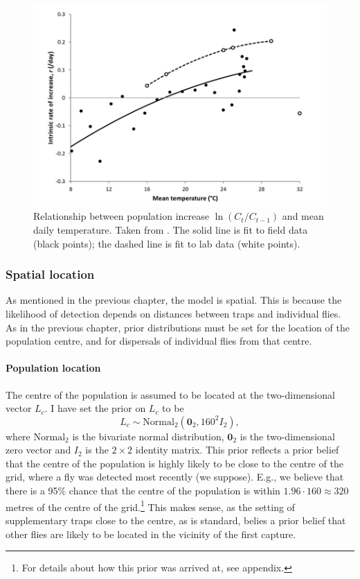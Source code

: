 \documentclass[
  oneside]{book}
\begin{document}
\begin{figure}

{\centering \includegraphics[width=0.75\linewidth]{references/ksplot} 

}

\caption{Relationship between population increase \(\ln (C_t / C_{t-1})\) and mean daily temperature. Taken from \citet{ks2019}. The solid line is fit to field data (black points); the dashed line is fit to lab data (white points).}\label{fig:ksplot}
\end{figure}

\hypertarget{spatial-location}{%
\subsubsection{Spatial location}\label{spatial-location}}

As mentioned in the previous chapter, the model is spatial. This is because the likelihood of detection depends on distances between traps and individual flies. As in the previous chapter, prior distributions must be set for the location of the population centre, and for dispersals of individual flies from that centre.

\hypertarget{population-location}{%
\paragraph{Population location}\label{population-location}}

The centre of the population is assumed to be located at the two-dimensional vector \(L_c\). I have set the prior on \(L_c\) to be
\[
L_c \sim \mathrm {Normal}_2 (\mathbf 0_2, 160^2 I_2),
\]
where \(\mathrm{Normal}_2\) is the bivariate normal distribution, \(\mathbf 0_2\) is the two-dimensional zero vector and \(I_2\) is the \(2 \times 2\) identity matrix. This prior reflects a prior belief that the centre of the population is highly likely to be close to the centre of the grid, where a fly was detected most recently (we suppose). E.g., we believe that there is a 95\% chance that the centre of the population is within \(1.96 \cdot 160 \approx 320\) metres of the centre of the grid.\footnote{For details about how this prior was arrived at, see appendix.} This makes sense, as the setting of supplementary traps close to the centre, as is standard, belies a prior belief that other flies are likely to be located in the vicinity of the first capture.
\end{document}
